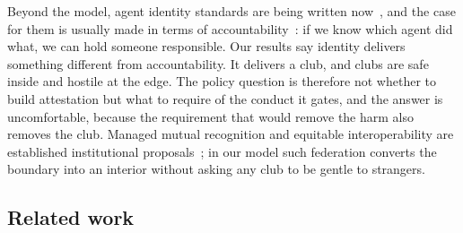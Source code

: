 \documentclass[preprint,12pt]{elsarticle}
\theoremstyle{plain}
\theoremstyle{definition}
\begin{document}
Beyond the model, agent identity standards are being written
now~\citep{a2a2026spec,xu2026agentdid,grogan2025agentfacts}, and the case for
them is usually made in terms of
accountability~\citep{south2025delegation}: if we know which agent did what, we
can hold someone responsible. Our results say identity delivers something
different from accountability. It delivers a club, and clubs are safe inside
and hostile at the edge. The policy question is therefore not whether to build
attestation but what to require of the conduct it gates, and the answer is
uncomfortable, because the requirement that would remove the harm also removes
the club. Managed mutual recognition and equitable interoperability are
established institutional
proposals~\citep{nicolaidis2005transnational,scottmorton2023equitable}; in our
model such federation converts the boundary into an interior without asking any
club to be gentle to strangers.


\subsection{Related work}
\label{sec:related}
\end{document}
